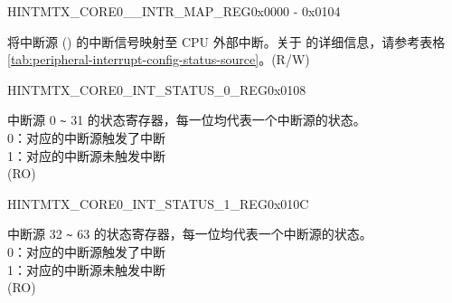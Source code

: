 \begin{register}{H}{INTMTX\_CORE0\_\_INTR\_MAP\_REG}{0x0000 - 0x0104}\label{INTMTXCORE0SOURCEINTRMAPREG}
%
%
\regnewline%
\begin{regdesc}\begin{reglist}
\label{INTMTXCORE0SOURCEINTRMAP}\item [INTMTX\_CORE0\_\regindex{SOURCE}\_INTR\_MAP] 将中断源 () 的中断信号映射至 CPU 外部中断。关于  的详细信息，请参考表格 \ref{tab:peripheral-interrupt-config-status-source}。(R/W)
\end{reglist}\end{regdesc}
\end{register}


\begin{register}{H}{INTMTX\_CORE0\_INT\_STATUS\_0\_REG}{0x0108}\label{regdesc:INTMTXCORE0INTSTATUS0REG}
%
\regnewline%
\begin{regdesc}\begin{reglist}
\label{fielddesc:INTMTXCORE0INTSTATUS0}\item [INTMTX\_CORE0\_INT\_STATUS\_0] 中断源 0 \verb+~+ 31 的状态寄存器，每一位均代表一个中断源的状态。\\

0：对应的中断源触发了中断\\
1：对应的中断源未触发中断\\ (RO)
\end{reglist}\end{regdesc}
\end{register}


\begin{register}{H}{INTMTX\_CORE0\_INT\_STATUS\_1\_REG}{0x010C}\label{regdesc:INTMTXCORE0INTSTATUS1REG}
%
\regnewline%
\begin{regdesc}\begin{reglist}
\label{fielddesc:INTMTXCORE0INTSTATUS1}\item [INTMTX\_CORE0\_INT\_STATUS\_1] 中断源 32 \verb+~+ 63 的状态寄存器，每一位均代表一个中断源的状态。\\
0：对应的中断源触发了中断\\
1：对应的中断源未触发中断\\ (RO)
\end{reglist}\end{regdesc}
\end{register}

